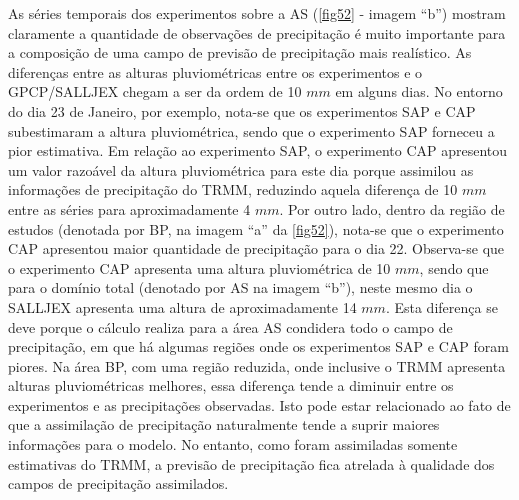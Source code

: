As séries temporais dos experimentos sobre a AS (\autoref{fig52} - imagem ``b'') mostram claramente a quantidade de observações de precipitação é muito importante para a composição de uma campo de previsão de precipitação mais realístico. As diferenças entre as alturas pluviométricas entre os experimentos e o GPCP/SALLJEX chegam a ser da ordem de 10 $mm$ em alguns dias. No entorno do dia 23 de Janeiro, por exemplo, nota-se que os experimentos SAP e CAP subestimaram a altura pluviométrica, sendo que o experimento SAP forneceu a pior estimativa.  Em relação ao experimento SAP, o experimento CAP apresentou um valor razoável da altura pluviométrica para este dia porque assimilou as informações de precipitação do TRMM, reduzindo aquela diferença de 10 $mm$ entre as séries para aproximadamente 4 $mm$. Por outro lado, dentro da região de estudos (denotada por BP, na imagem ``a'' da \autoref{fig52}), nota-se que o experimento CAP apresentou maior quantidade de precipitação para o dia 22. Observa-se que o experimento CAP apresenta uma altura pluviométrica de 10 $mm$, sendo que para o domínio total (denotado por AS na imagem ``b''), neste mesmo dia o SALLJEX apresenta uma altura de aproximadamente 14 $mm$. Esta diferença se deve porque o cálculo realiza para a área AS condidera todo o campo de precipitação, em que há algumas regiões onde os experimentos SAP e CAP foram piores. Na área BP, com uma região reduzida, onde inclusive o TRMM apresenta alturas pluviométricas melhores, essa diferença tende a diminuir entre os experimentos e as precipitações observadas. Isto pode estar relacionado ao fato de que a assimilação de precipitação naturalmente tende a suprir maiores informações para o modelo. No entanto, como foram assimiladas somente estimativas do TRMM, a previsão de precipitação fica atrelada à qualidade dos campos de precipitação assimilados. 

